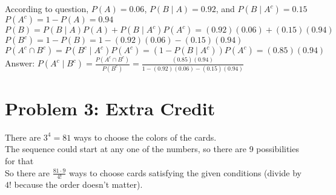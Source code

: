 \documentclass[12pt, leqno]{article}
\begin{document}
\begin{enumerate}
    According to question, $P(A) = 0.06$, $P(B \mid A) = 0.92$, and $P(B \mid A^c) = 0.15$\\
    $P(A^c) = 1 - P(A) = 0.94$\\
    $P(B) = P(B \mid A)P(A) + P(B \mid A^c)P(A^c) = (0.92)(0.06) + (0.15)(0.94)$\\
    $P(B^c) = 1 - P(B) = 1 - (0.92)(0.06) - (0.15)(0.94)$\\
    $P(A^c \cap B^c) = P(B^c \mid A^c)P(A^c) = (1 - P(B \mid A^c))P(A^c) = (0.85)(0.94)$\\
    Answer: $\displaystyle P(A^c \mid B^c) = \frac{P(A^c \cap B^c)}{P(B^c)} = \frac{(0.85)(0.94)}{1 - (0.92)(0.06) - (0.15)(0.94)}$
\end{enumerate}

\pagebreak

\section*{Problem 3: Extra Credit}

There are $3^4 = 81$ ways to choose the colors of the cards.\\
The sequence could start at any one of the numbers, so there are 9 possibilities for that\\
So there are $\displaystyle \frac{81 \cdot 9}{4!}$ ways to choose cards satisfying the given conditions (divide by $4!$ because the order doesn't matter).
\end{document}
